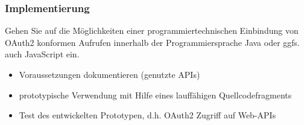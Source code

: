 \documentclass[notitlepage, hidelinks]{article}
\begin{document}
\subsubsection{Implementierung}
Gehen Sie auf die Möglichkeiten einer programmiertechnischen Einbindung von OAuth2 konformen Aufrufen innerhalb der Programmiersprache Java oder ggfs. auch JavaScript ein. 
\begin{itemize}
\item Voraussetzungen dokumentieren (genutzte APIs)
\item prototypische Verwendung mit Hilfe eines lauffähigen Quellcodefragments
\item Test des entwickelten Prototypen, d.h. OAuth2 Zugriff auf Web-APIs
\end{itemize}

\newpage




\end{document}
